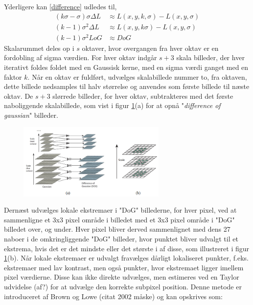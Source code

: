 Yderligere kan \eqref{difference} udledes til,
\begin{equation}
\begin{split}
(k\sigma-\sigma)\sigma\Delta L &\approx L(x,y,k,\sigma)-L(x,y,\sigma) \\
(k-1)\sigma^2\Delta L &\approx L(x,y,k\sigma)-L(x,y,\sigma) \\
(k-1)\sigma^2LoG &\approx DoG
\end{split}
\end{equation}
Skalarummet deles op i $s$ oktaver, hvor overgangen fra hver oktav er en fordobling af sigma værdien. For hver oktav indgår $s+3$ skala billeder, der hver iterativt foldes foldet med en Gaussisk kerne, med en sigma værdi ganget med en faktor $k$. Når en oktav er fuldført, udvælges skalabillede nummer to, fra oktaven, dette billede nedsamples til halv størrelse og anvendes som første billede til næste oktav. De $s+3$ slørrede billeder, for hver oktav, subtrakteres med det første naboliggende skalabillede, som vist i figur \ref{fig:difference}(a) for at opnå "\textit{difference of gaussian}" billeder.
\begin{figure}[H]
    \centering
    \includegraphics[width=0.65\textwidth]{fig/30.png}
     \vspace{-1em}
    \begin{center}    
       \caption{\textcolor{gray}{\footnotesize \textit{ }}}
    \label{fig:difference}
     \end{center}
     \vspace{-2.5em}
  \end{figure} \noindent
Dernæst udvælges lokale ekstremaer i "DoG" billederne, for hver pixel, ved at sammenligne et 3x3 pixel område i billedet med et 3x3 pixel område i "DoG" billedet over, og under. Hver pixel bliver derved sammenlignet med dens 27 naboer i de omkringliggende "DoG" billeder, hvor punktet bliver udvalgt til et ekstrema, hvis det er det mindste eller det største i af disse, som illustreret i figur \ref{fig:difference}(b). Når lokale ekstremaer er udvalgt fravælges dårligt lokaliseret punkter, f.eks. ekstremaer med lav kontrast, men også punkter, hvor ekstremaet ligger imellem pixel værdierne. Disse kan ikke direkte udvælges, men estimeres ved en Taylor udvidelse (af?) for at udvælge den korrekte subpixel position. Denne metode er introduceret af Brown og Lowe (citat 2002 måske) og kan opskrives som:
